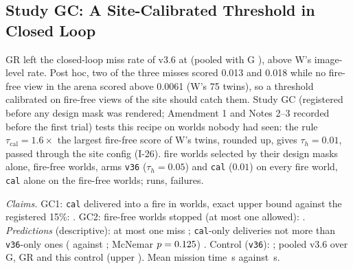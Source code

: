 \documentclass[conference]{IEEEtran}
\begin{document}
\subsection{Study GC: A Site-Calibrated Threshold in Closed Loop}\label{sec:moved-gc}
GR left the closed-loop miss rate of v3.6 at \GRVThreeSix{} (pooled with G \GRPool{}), above W's image-level rate. Post hoc, two of the three misses scored 0.013 and 0.018 while no fire-free view in the arena scored above 0.0061 (W's 75 twins), so a threshold calibrated on fire-free views of the site should catch them. Study GC (registered before any design mask was rendered; Amendment 1 and Notes 2--3 recorded before the first trial) tests this recipe on worlds nobody had seen: the rule $\tau_{\mathrm{cal}}=1.6\times$ the largest fire-free score of W's twins, rounded up, gives $\tau_h=0.01$, passed through the site config (I-26). \GCWorlds{} fire worlds selected by their design masks alone, \GCPlain{} fire-free worlds, arms \texttt{v36} ($\tau_h=0.05$) and \texttt{cal} ($0.01$) on every fire world, \texttt{cal} alone on the fire-free worlds; \GCN{} runs, \GCFailed{} failures.

\emph{Claims.} GC1: \texttt{cal} delivered into a fire in \GCCal{} worlds, exact upper bound \GCCalUpper{} against the registered 15\%: \GCOneHolds. GC2: \GCFalseStops{} fire-free worlds stopped (at most one allowed): \GCTwoHolds. \emph{Predictions} (descriptive): at most one miss \GCPredOne; \texttt{cal}-only deliveries not more than \texttt{v36}-only ones (\GCOnlyCal{} against \GCOnlyV; McNemar $p=0.125$) \GCPredTwo. Control (\texttt{v36}): \GCVThreeSix; pooled v3.6 over G, GR and this control \GCPool{} (upper \GCPoolUpper). Mean mission time \GCTimeCal\,s against \GCTimeVThreeSix\,s.
\end{document}
